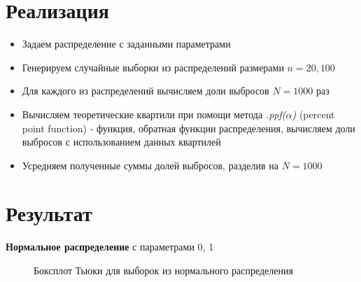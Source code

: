\documentclass[12pt]{article}
\begin{document}

\section*{Реализация }
\begin{itemize}
    \item Задаем распределение с заданными параметрами 
    \item Генерируем случайные выборки из распределений размерами $n = 20, 100$
    \item Для каждого из распределений вычисляем доли выбросов $N = 1000$ раз
    \item Вычисляем теоретические квартили при помощи метода \textit{.ppf($\alpha$)} (percent point function) - функция, обратная функции распределения, вычисляем доли выбросов с использованием данных квартилей
    \item Усредняем полученные суммы долей выбросов, разделив на $N = 1000$ 
\end{itemize}


\newpage
\section*{Результат}

\textbf{Нормальное распределение} с параметрами 0, 1\\
\begin{center}
\end{center}

\begin{figure}[h!]
\centering
{}
\label{pic:1}
\caption{Боксплот Тьюки для выборок из нормального распределения}
\end{figure}
\vspace{4.cm}
\end{document}
